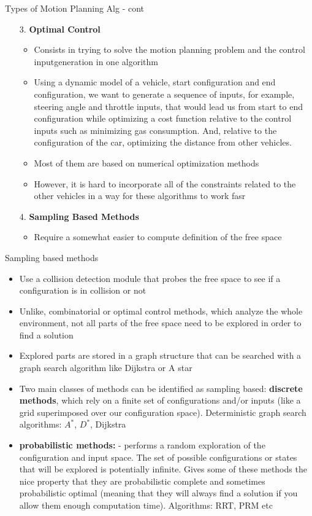 \documentclass[10pt,mathserif]{beamer}
\begin{document}
\begin{frame}{Types of Motion Planning Alg - cont}
\begin{enumerate}
\item[3.] \textbf{Optimal Control}
\begin{itemize}
\item Consists in trying to solve the motion planning problem and the control inputgeneration in one algorithm
\item Using a dynamic model of a vehicle, start configuration and end configuration, we want to generate a sequence of inputs, for example, steering angle and throttle inputs, that would lead us from start to end configuration while optimizing a cost function relative to the control inputs such as minimizing gas consumption. And, relative to the configuration of the car, optimizing the distance from other vehicles.  
\item Most of them are based on numerical optimization methods
\item However, it is hard to incorporate all of the constraints related to the other vehicles in a way for these algorithms to work fasr
\end{itemize}
\item[4.] \textbf{Sampling Based Methods}
\begin{itemize}
\item Require a somewhat easier to compute definition of the free space
\end{itemize}
\end{enumerate}
\end{frame}

\begin{frame}{Sampling based methods}
\begin{itemize}
\item Use a collision detection module that probes the free space to see if a configuration is in collision or not
\item Unlike, combinatorial or optimal control methods, which analyze the whole environment, not all parts of the free space need to be explored in order to find a solution
\item Explored parts are stored in a graph structure that can be searched with a
graph search algorithm like Dijkstra or A star
\item Two main classes of methods can be identified as sampling based: \textbf{discrete methods}, which rely on a finite set of configurations and/or inputs (like a grid superimposed over our configuration space). Deterministic graph search algorithms: $A^*$, $D^*$, Dijkstra
\item \textbf{probabilistic methods:} - performs a random exploration of the configuration and input space. The set of possible configurations or states that will be explored is potentially infinite. Gives some of these methods the nice property that they are probabilistic complete and sometimes probabilistic optimal (meaning that they will always find a solution if you allow them enough computation time). Algorithms: RRT, PRM etc
\end{itemize}
\end{frame}
\end{document}
